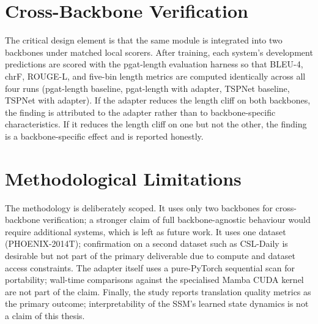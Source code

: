 \section{Cross-Backbone Verification}

The critical design element is that the same module is integrated into two backbones under matched local scorers. After training, each system's development predictions are scored with the pgat-length evaluation harness so that BLEU-4, chrF, ROUGE-L, and five-bin length metrics are computed identically across all four runs (pgat-length baseline, pgat-length with adapter, TSPNet baseline, TSPNet with adapter). If the adapter reduces the length cliff on both backbones, the finding is attributed to the adapter rather than to backbone-specific characteristics. If it reduces the length cliff on one but not the other, the finding is a backbone-specific effect and is reported honestly.

\section{Methodological Limitations}

The methodology is deliberately scoped. It uses only two backbones for cross-backbone verification; a stronger claim of full backbone-agnostic behaviour would require additional systems, which is left as future work. It uses one dataset (PHOENIX-2014T); confirmation on a second dataset such as CSL-Daily is desirable but not part of the primary deliverable due to compute and dataset access constraints. The adapter itself uses a pure-PyTorch sequential scan for portability; wall-time comparisons against the specialised Mamba CUDA kernel are not part of the claim. Finally, the study reports translation quality metrics as the primary outcome; interpretability of the SSM's learned state dynamics is not a claim of this thesis.
